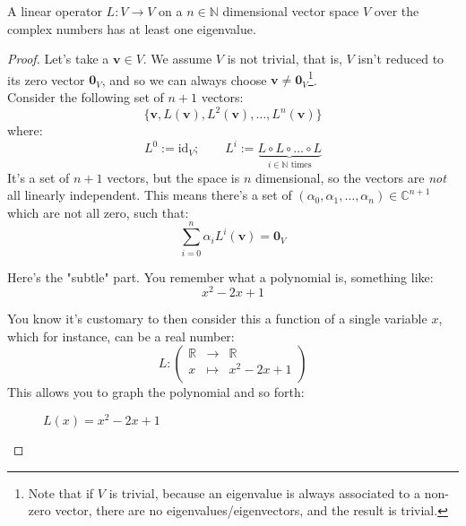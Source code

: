 \documentclass[solutions.tex]{subfiles}
\renewcommand{\bm}[1]{\pmb{#1}}
\begin{document}
\begin{lemma} A linear operator $L : V \rightarrow V$
on a $n\in\mathbb{N}$ dimensional vector space $V$
over the complex numbers has at least one eigenvalue.
\end{lemma}
\begin{proof}
Let's take a $\bm{v}\in V$. We assume $V$ is not trivial, that
is, $V$ isn't reduced to its zero vector $\bm{0}_V$, and so
we can always choose $\bm{v} \neq \bm{0}_V$\footnote{Note that
if $V$ is trivial, because an eigenvalue is always associated
to a non-zero vector, there are no eigenvalues/eigenvectors, and
the result is trivial.}. \\

Consider the following set of $n+1$ vectors:
\[
	\{ \bm{v}, L(\bm{v}), L^2(\bm{v}), \ldots, L^n(\bm{v}) \}
\]
where:
\[
	L^0 := \text{id}_V;\qquad L^i := \underbrace{
		L\circ L\circ\ldots\circ L
	}_{i\in\mathbb{N}\text{ times}}
\]
It's a set of $n+1$ vectors, but the space is $n$ dimensional, so
the vectors are \textit{not} all linearly independent. This
means there's a set of $(\alpha_0, \alpha_1, \ldots, \alpha_n)\in\mathbb{C}^{n+1}$
which are not all zero, such that:
\begin{equation}
	\sum_{i=0}^n \alpha_iL^i(\bm{v}) = \bm{0}_V \label{qm:L03E01:not-linindep}
\end{equation}

Here's the "subtle" part. You remember what a polynomial is,
something like: \[ x^2 - 2x + 1 \]

You know it's customary to then consider this a function of
a single variable $x$, which for instance, can be a real number:
\[
	L : \begin{pmatrix}
		\mathbb{R} & \rightarrow & \mathbb{R} \\
		x & \mapsto & x^2 - 2x + 1 \\
	\end{pmatrix}
\]
This allows you to graph the polynomial and so forth:

\begin{figure}[H]
	\centering
	\caption{$L(x) = x^2 - 2x + 1$}
\end{figure}


\end{proof}
\end{document}
